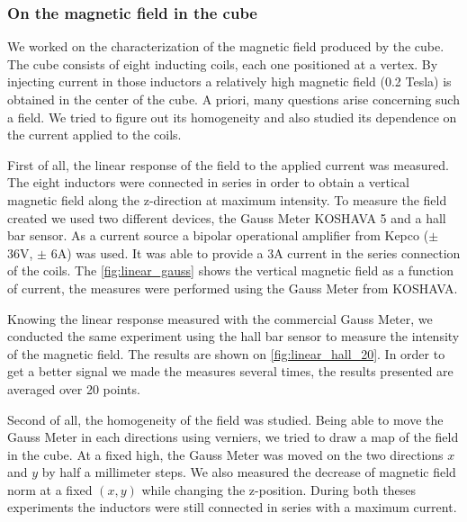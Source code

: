 \documentclass[journal]{IEEEtran}
\begin{document}






\subsubsection{On the magnetic field in the cube}

We worked on the characterization of the magnetic field produced by the cube. The cube consists of eight inducting coils, each one positioned at a vertex. By injecting current in those inductors a relatively high magnetic field (0.2 Tesla) is obtained in the center of the cube. A priori, many questions arise concerning such a field. We tried to figure out its homogeneity and also studied its dependence on the current applied to the coils.






First of all, the linear response of the field to the applied current was measured. The eight inductors were connected in series in order to obtain a vertical magnetic field along the z-direction at maximum intensity. To measure the field created we used two different devices, the Gauss Meter KOSHAVA 5 and a hall bar sensor. As a current source a bipolar operational amplifier from Kepco ($\pm$ 36V, $\pm$ 6A) was used. It was able to provide a 3A current in the series connection of the coils. The \figurename \ref{fig:linear_gauss} shows the vertical magnetic field as a function of current, the measures were performed using the Gauss Meter from KOSHAVA.

Knowing the linear response measured with the commercial Gauss Meter, we conducted the same experiment using the hall bar sensor to measure the intensity of the magnetic field. The results are shown on \figurename \ref{fig:linear_hall_20}. In order to get a better signal we made the measures several times, the results presented are averaged over 20 points.

Second of all, the homogeneity of the field was studied. Being able to move the Gauss Meter in each directions using verniers, we tried to draw a map of the field in the cube. At a fixed high, the Gauss Meter was moved on the two directions $x$ and $y$ by half a millimeter steps. We also measured the decrease of magnetic field norm at a fixed $(x,y)$ while changing the z-position. During both theses experiments the inductors were still connected in series with a maximum current.
\end{document}
